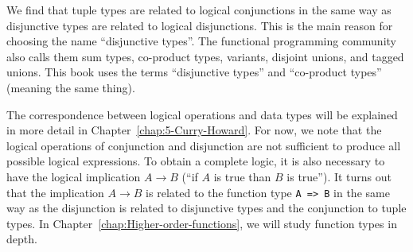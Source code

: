 We find that tuple types are related to logical conjunctions in the
same way as disjunctive types are related to logical disjunctions.
This is the main reason for choosing the name \textsf{``}disjunctive types\textsf{''}.
The functional programming community also calls them sum types,
co-product types,
variants, disjoint unions,
and tagged unions.
This book uses the terms \textsf{``}disjunctive types\textsf{''} and \textsf{``}co-product
types\textsf{''} (meaning the same thing).

The correspondence between logical operations and data types will
be explained in more detail in Chapter~\ref{chap:5-Curry-Howard}.
For now, we note that the logical operations of conjunction and disjunction
are not sufficient to produce all possible logical expressions. To
obtain a complete logic, it is also necessary to have the logical
implication $A\rightarrow B$ (\textsf{``}if $A$ is true than $B$ is true\textsf{''}).
It turns out that the implication $A\rightarrow B$ is related to
the function type \lstinline!A => B! in the same way as the disjunction
is related to disjunctive types and the conjunction to tuple types.
In Chapter~\ref{chap:Higher-order-functions}, we will study function
types in depth.
